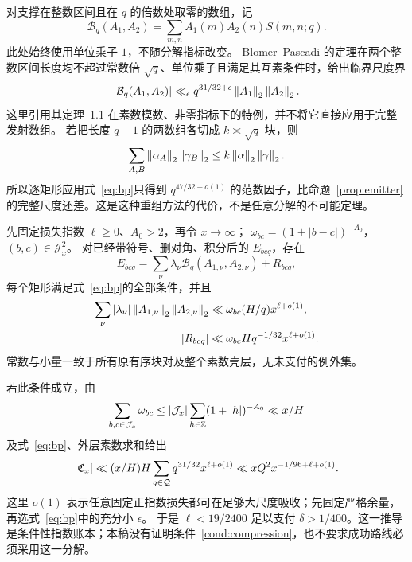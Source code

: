 对支撑在整数区间且在 $q$ 的倍数处取零的数组，记
\[
\mathcal B_q(A_1,A_2)=\sum_{m,n}A_1(m)A_2(n)S(m,n;q).
\]
此处始终使用单位乘子 $1$，不随分解指标改变。
Blomer--Pascadi 的定理在两个整数区间长度均不超过常数倍 $\sqrt q$、单位乘子且满足其互素条件时，给出临界尺度界
\begin{equation}
|\mathcal B_q(A_1,A_2)|\ll_\epsilon q^{31/32+\epsilon}
\left\|A_1\right\|_2\left\|A_2\right\|_2.\label{eq:bp}
\end{equation}
这里引用其定理~1.1 在素数模数、非零指标下的特例\cite{blomer2026}，并不将它直接应用于完整发射数组。
若把长度 $q-1$ 的两数组各切成 $k\asymp\sqrt q$ 块，则
\[
\sum_{A,B}\left\|\alpha_A\right\|_2\left\|\gamma_B\right\|_2\le k\left\|\alpha\right\|_2\left\|\gamma\right\|_2.
\]
所以逐矩形应用式~\eqref{eq:bp}只得到 $q^{47/32+o(1)}$ 的范数因子，比命题~\ref{prop:emitter}的完整尺度还差。这是这种重组方法的代价，不是任意分解的不可能定理。

\begin{condition}[尚未证明的带代价双侧附接]\label{cond:compression}
先固定损失指数 $\ell\ge0$、$A_0>2$，再令 $x\to\infty$；
$\omega_{bc}=(1+|b-c|)^{-A_0}$，$(b,c)\in\mathcal J_x^2$。
对已经带符号、删对角、积分后的 $E_{bcq}$，存在
\[
E_{bcq}=\sum_\nu\lambda_\nu\mathcal B_q(A_{1,\nu},A_{2,\nu})+R_{bcq},
\]
每个矩形满足式~\eqref{eq:bp}的全部条件，并且
\begin{align*}
\sum_\nu|\lambda_\nu|\left\|A_{1,\nu}\right\|_2\left\|A_{2,\nu}\right\|_2
&\ll\omega_{bc}(H/q)x^{\ell+o(1)},\\
|R_{bcq}|&\ll\omega_{bc}Hq^{-1/32}x^{\ell+o(1)}.
\end{align*}
常数与小量一致于所有原有序块对及整个素数壳层，无未支付的例外集。
\end{condition}
若此条件成立，由
\[
\sum_{b,c\in\mathcal J_x}\omega_{bc}
\le |\mathcal J_x|\sum_{h\in\mathbb Z}(1+|h|)^{-A_0}\ll x/H
\]
及式~\eqref{eq:bp}、外层素数求和给出
\[
|\mathfrak C_x|\ll (x/H)H\sum_{q\in\mathcal Q}q^{31/32}x^{\ell+o(1)}
\ll xQ^2x^{-1/96+\ell+o(1)}.
\]
这里 $o(1)$ 表示任意固定正指数损失都可在足够大尺度吸收；先固定严格余量，再选式~\eqref{eq:bp}中的充分小 $\epsilon$。
于是 $\ell<19/2400$ 足以支付 $\delta>1/400$。这一推导是条件性指数账本；本稿没有证明条件~\ref{cond:compression}，也不要求成功路线必须采用这一分解。
